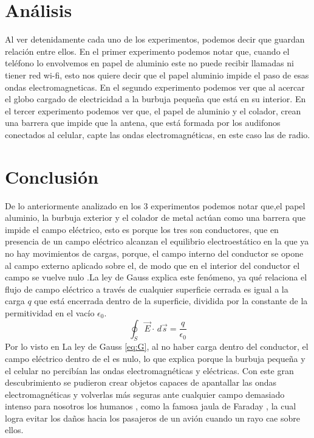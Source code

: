 \documentclass[a4paper, 12p]{article}
\begin{document}
\begin{multicols*}{2}
    
\section*{Análisis}
Al ver detenidamente cada uno de los experimentos, podemos decir que guardan relación entre ellos.
En el primer experimento podemos notar que, cuando el teléfono lo envolvemos en papel de aluminio este no puede recibir llamadas ni tiener red wi-fi, esto nos quiere decir que el papel aluminio impide el paso de esas ondas electromagneticas.
En el segundo experimento podemos ver que al acercar el globo cargado de electricidad a la burbuja pequeña que está en su interior.%
En el tercer experimento podemos ver que, el papel de aluminio y el colador, crean una barrera que impide que la antena, que está formada por los audifonos conectados al celular, capte las ondas electromagnéticas, en este caso las de radio.



\section*{Conclusión}
De lo anteriormente analizado en los 3 experimentos podemos notar que,el papel aluminio, la burbuja exterior y el colador de metal actúan como una barrera que impide el campo eléctrico, esto es porque los tres son conductores, que en presencia de un campo eléctrico alcanzan el equilibrio electroestático en la que ya no hay movimientos de cargas, porque, el campo interno del conductor se opone al campo externo aplicado sobre el, de modo que en el interior del conductor el campo se vuelve nulo \cite{Electrostatica}.La ley de Gauss explica este fenómeno, ya qué relaciona el flujo de campo eléctrico a través de cualquier superficie cerrada es igual a la carga $q$ que está encerrada dentro de la superficie, dividida por la constante de la permitividad en el vacío $\epsilon_0$.
\begin{equation}\label{eq:G}
\oint_S \! \vec{E} \cdot  \, d\vec{s} = \dfrac{q}{\epsilon_0}
\end{equation}
Por lo visto en La ley de Gauss \ref{eq:G}, al no haber carga dentro del conductor, el campo eléctrico dentro de el es nulo, lo que explica porque la burbuja pequeña y el celular no percibían las ondas electromagnéticas y eléctricas.
Con este gran descubrimiento se pudieron crear objetos capaces de apantallar las ondas electromagnéticas y volverlas más seguras ante cualquier campo demasiado intenso para nosotros los humanos , como la famosa jaula de Faraday , la cual logra evitar los daños hacia los pasajeros de un avión cuando un rayo cae sobre ellos.


\end{multicols*}
\end{document}
